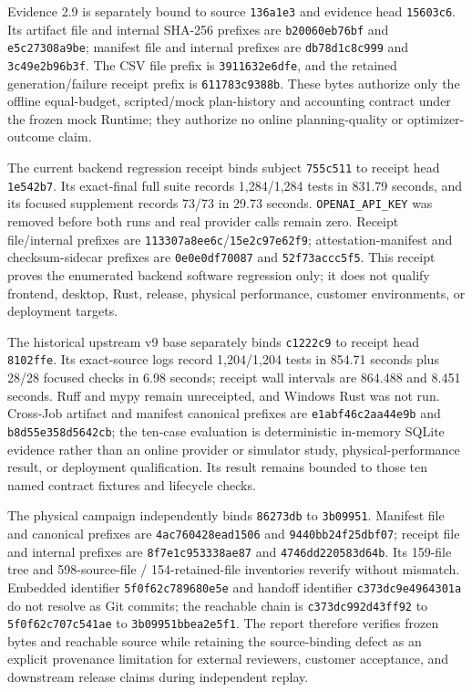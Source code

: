 Evidence 2.9 is separately bound to source \texttt{136a1e3} and evidence
head \texttt{15603c6}. Its artifact file and internal SHA-256 prefixes
are \texttt{b20060eb76bf} and \texttt{e5c27308a9be}; manifest file and
internal prefixes are \texttt{db78d1c8c999} and
\texttt{3c49e2b96b3f}. The CSV file prefix is
\texttt{3911632e6dfe}, and the retained generation/failure receipt prefix
is \texttt{611783c9388b}. These bytes authorize only the offline
equal-budget, scripted/mock plan-history and accounting contract under
the frozen mock Runtime; they authorize no online planning-quality or
optimizer-outcome claim.

The current backend regression receipt binds subject \texttt{755c511} to
receipt head \texttt{1e542b7}. Its exact-final full suite records
1,284/1,284 tests in 831.79 seconds, and its focused supplement records
73/73 in 29.73 seconds. \texttt{OPENAI\_API\_KEY} was removed before both
runs and real provider calls remain zero. Receipt file/internal prefixes
are \texttt{113307a8ee6c}/\texttt{15e2c97e62f9}; attestation-manifest and
checksum-sidecar prefixes are \texttt{0e0e0df70087} and
\texttt{52f73accc5f5}. This receipt proves the enumerated backend software
regression only; it does not qualify frontend, desktop, Rust, release,
physical performance, customer environments, or deployment targets.

The historical upstream v9 base separately binds \texttt{c1222c9} to receipt head
\texttt{8102ffe}. Its exact-source logs record 1,204/1,204 tests in
854.71 seconds plus 28/28 focused checks in 6.98 seconds; receipt wall
intervals are 864.488 and 8.451 seconds. Ruff and mypy remain
unreceipted, and Windows Rust was not run. Cross-Job artifact and manifest
canonical prefixes are \texttt{e1abf46c2aa44e9b} and
\texttt{b8d55e358d5642cb}; the ten-case evaluation is deterministic
in-memory SQLite evidence rather than an online provider or simulator
study, physical-performance result, or deployment qualification. Its result
remains bounded to those ten named contract fixtures and lifecycle checks.

The physical campaign independently binds \texttt{86273db} to
\texttt{3b09951}. Manifest file and canonical prefixes are
\texttt{4ac760428ead1506} and \texttt{9440bb24f25dbf07}; receipt file and
internal prefixes are \texttt{8f7e1c953338ae87} and
\texttt{4746dd220583d64b}. Its 159-file tree and 598-source-file /
154-retained-file inventories reverify without mismatch. Embedded
identifier \texttt{5f0f62c789680e5e} and handoff identifier
\texttt{c373dc9e4964301a} do not resolve as Git commits; the reachable
chain is \texttt{c373dc992d43ff92} to \texttt{5f0f62c707c541ae} to
\texttt{3b09951bbea2e5f1}. The report therefore verifies frozen bytes and
reachable source while retaining the source-binding defect as an explicit
provenance limitation for external reviewers, customer acceptance, and
downstream release claims during independent replay.

